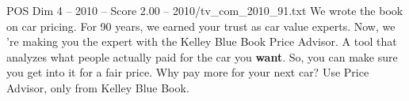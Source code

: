 \begin{textsample}{POS Dim 4 – 2010 – Score 2.00 – 2010/tv\_com\_2010\_91.txt}  \label{ex:f4_pos_052}
We wrote the book on car pricing.
For 90 years, we earned your trust as car value experts.
Now, we 're making you the expert with the Kelley Blue Book Price Advisor.
A tool that analyzes what people actually paid for the car you \textbf{want}.
So, you can make sure you get into it for a fair price.
Why pay more for your next car?
Use Price Advisor, only from Kelley Blue Book.

\end{textsample}
